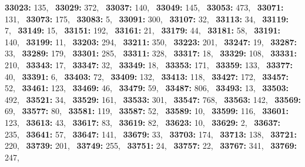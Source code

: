 \textbf{33023:} 135,\allowbreak~ 
\textbf{33029:} 372,\allowbreak~ 
\textbf{33037:} 140,\allowbreak~ 
\textbf{33049:} 145,\allowbreak~ 
\textbf{33053:} 473,\allowbreak~ 
\textbf{33071:} 131,\allowbreak~ 
\textbf{33073:} 175,\allowbreak~ 
\textbf{33083:} 5,\allowbreak~ 
\textbf{33091:} 300,\allowbreak~ 
\textbf{33107:} 32,\allowbreak~ 
\textbf{33113:} 34,\allowbreak~ 
\textbf{33119:} 7,\allowbreak~ 
\textbf{33149:} 15,\allowbreak~ 
\textbf{33151:} 192,\allowbreak~ 
\textbf{33161:} 21,\allowbreak~ 
\textbf{33179:} 44,\allowbreak~ 
\textbf{33181:} 58,\allowbreak~ 
\textbf{33191:} 140,\allowbreak~ 
\textbf{33199:} 11,\allowbreak~ 
\textbf{33203:} 294,\allowbreak~ 
\textbf{33211:} 350,\allowbreak~ 
\textbf{33223:} 201,\allowbreak~ 
\textbf{33247:} 19,\allowbreak~ 
\textbf{33287:} 33,\allowbreak~ 
\textbf{33289:} 179,\allowbreak~ 
\textbf{33301:} 285,\allowbreak~ 
\textbf{33311:} 328,\allowbreak~ 
\textbf{33317:} 18,\allowbreak~ 
\textbf{33329:} 108,\allowbreak~ 
\textbf{33331:} 210,\allowbreak~ 
\textbf{33343:} 17,\allowbreak~ 
\textbf{33347:} 32,\allowbreak~ 
\textbf{33349:} 18,\allowbreak~ 
\textbf{33353:} 171,\allowbreak~ 
\textbf{33359:} 133,\allowbreak~ 
\textbf{33377:} 40,\allowbreak~ 
\textbf{33391:} 6,\allowbreak~ 
\textbf{33403:} 72,\allowbreak~ 
\textbf{33409:} 132,\allowbreak~ 
\textbf{33413:} 118,\allowbreak~ 
\textbf{33427:} 172,\allowbreak~ 
\textbf{33457:} 52,\allowbreak~ 
\textbf{33461:} 123,\allowbreak~ 
\textbf{33469:} 46,\allowbreak~ 
\textbf{33479:} 59,\allowbreak~ 
\textbf{33487:} 806,\allowbreak~ 
\textbf{33493:} 13,\allowbreak~ 
\textbf{33503:} 492,\allowbreak~ 
\textbf{33521:} 34,\allowbreak~ 
\textbf{33529:} 161,\allowbreak~ 
\textbf{33533:} 301,\allowbreak~ 
\textbf{33547:} 768,\allowbreak~ 
\textbf{33563:} 142,\allowbreak~ 
\textbf{33569:} 69,\allowbreak~ 
\textbf{33577:} 80,\allowbreak~ 
\textbf{33581:} 119,\allowbreak~ 
\textbf{33587:} 52,\allowbreak~ 
\textbf{33589:} 10,\allowbreak~ 
\textbf{33599:} 116,\allowbreak~ 
\textbf{33601:} 123,\allowbreak~ 
\textbf{33613:} 43,\allowbreak~ 
\textbf{33617:} 83,\allowbreak~ 
\textbf{33619:} 82,\allowbreak~ 
\textbf{33623:} 10,\allowbreak~ 
\textbf{33629:} 2,\allowbreak~ 
\textbf{33637:} 235,\allowbreak~ 
\textbf{33641:} 57,\allowbreak~ 
\textbf{33647:} 141,\allowbreak~ 
\textbf{33679:} 33,\allowbreak~ 
\textbf{33703:} 174,\allowbreak~ 
\textbf{33713:} 138,\allowbreak~ 
\textbf{33721:} 220,\allowbreak~ 
\textbf{33739:} 201,\allowbreak~ 
\textbf{33749:} 255,\allowbreak~ 
\textbf{33751:} 24,\allowbreak~ 
\textbf{33757:} 22,\allowbreak~ 
\textbf{33767:} 341,\allowbreak~ 
\textbf{33769:} 247,\allowbreak~ 
